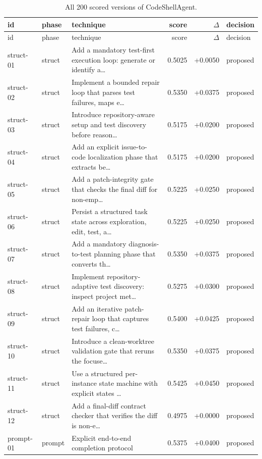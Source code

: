 \begin{center}\scriptsize\begin{longtable}{llp{5.2cm}rrl}
\caption{All 200 scored versions of CodeShellAgent.}\\
\toprule id & phase & technique & score & $\Delta$ & decision \\ \midrule \endfirsthead
\toprule id & phase & technique & score & $\Delta$ & decision \\ \midrule \endhead
struct-01 & struct & Add a mandatory test-first execution loop: generate or identify a\ldots{} & 0.5025 & +0.0050 & proposed \\
struct-02 & struct & Implement a bounded repair loop that parses test failures, maps e\ldots{} & 0.5350 & +0.0375 & proposed \\
struct-03 & struct & Introduce repository-aware setup and test discovery before reason\ldots{} & 0.5175 & +0.0200 & proposed \\
struct-04 & struct & Add an explicit issue-to-code localization phase that extracts be\ldots{} & 0.5175 & +0.0200 & proposed \\
struct-05 & struct & Add a patch-integrity gate that checks the final diff for non-emp\ldots{} & 0.5225 & +0.0250 & proposed \\
struct-06 & struct & Persist a structured task state across exploration, edit, test, a\ldots{} & 0.5225 & +0.0250 & proposed \\
struct-07 & struct & Add a mandatory diagnosis-to-test planning phase that converts th\ldots{} & 0.5350 & +0.0375 & proposed \\
struct-08 & struct & Implement repository-adaptive test discovery: inspect project met\ldots{} & 0.5275 & +0.0300 & proposed \\
struct-09 & struct & Add an iterative patch-repair loop that captures test failures, c\ldots{} & 0.5400 & +0.0425 & proposed \\
struct-10 & struct & Introduce a clean-worktree validation gate that reruns the focuse\ldots{} & 0.5350 & +0.0375 & proposed \\
struct-11 & struct & Use a structured per-instance state machine with explicit states \ldots{} & 0.5425 & +0.0450 & proposed \\
struct-12 & struct & Add a final-diff contract checker that verifies the diff is non-e\ldots{} & 0.4975 & +0.0000 & proposed \\
prompt-01 & prompt & Explicit end-to-end completion protocol & 0.5375 & +0.0400 & proposed \\

\end{longtable}
\end{center}
